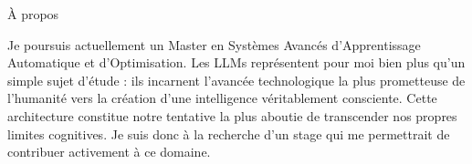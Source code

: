 \begin{rubric}{À propos}
\noentry{~}

\begin{minipage}[t]{\textwidth}
Je poursuis actuellement un Master en Systèmes Avancés d'Apprentissage Automatique et d'Optimisation. Les LLMs représentent pour moi bien plus qu'un simple sujet d'étude : ils incarnent l'avancée technologique la plus prometteuse de l'humanité vers la création d'une intelligence véritablement consciente. Cette architecture constitue notre tentative la plus aboutie de transcender nos propres limites cognitives. Je suis donc à la recherche d'un stage qui me permettrait de contribuer activement à ce domaine.
\end{minipage}

\end{rubric}


